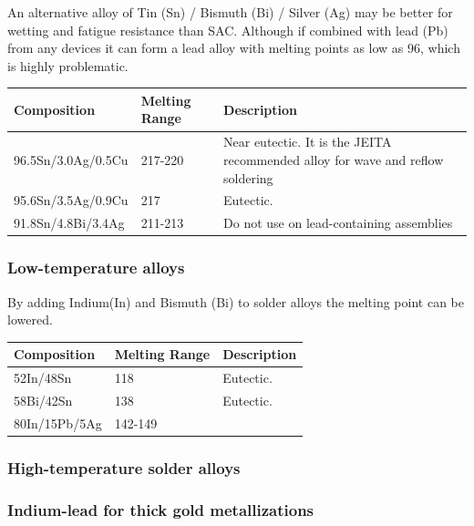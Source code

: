 \documentclass{article}
\begin{document}
		An alternative alloy of Tin (Sn) / Bismuth (Bi) / Silver (Ag) may be better for wetting and fatigue resistance than SAC.
		Although if combined with lead (Pb) from any devices it can form a lead alloy with melting points as low as 96\degree , which is highly problematic.
		 \begin{center}
 			\begin{tabular}{| m{10em} | m{5em}| m{17em} |} 
 			\hline
 			\textbf{Composition} & \textbf{Melting Range} & \textbf{Description} \\ [0.5ex] 
 			\hline\hline
 			96.5Sn/3.0Ag/0.5Cu & 217-220\degree & Near eutectic. It is the JEITA recommended alloy for wave and reflow soldering \\ 
 			\hline
 			95.6Sn/3.5Ag/0.9Cu & 217\degree & Eutectic. \\ 
 			\hline
 			91.8Sn/4.8Bi/3.4Ag & 211-213\degree & Do not use on lead-containing assemblies \\
 			\hline
			\end{tabular}
		\end{center}
		
		\subsubsection{Low-temperature alloys}
		By adding Indium(In) and Bismuth (Bi) to solder alloys the melting point can be lowered.
		 \begin{center}
 			\begin{tabular}{| m{10em} | m{5em}| m{17em} |} 
 			\hline
 			\textbf{Composition} & \textbf{Melting Range} & \textbf{Description} \\ [0.5ex] 
 			\hline\hline
 			52In/48Sn & 118\degree & Eutectic. \\ 
 			\hline
 			58Bi/42Sn & 138\degree & Eutectic. \\ 
 			\hline
 			80In/15Pb/5Ag & 142-149\degree &  \\
 			\hline
			\end{tabular}
		\end{center}
		
		\subsubsection{High-temperature solder alloys}
		
		
		\subsubsection{Indium-lead for thick gold metallizations}
		
\end{document}
